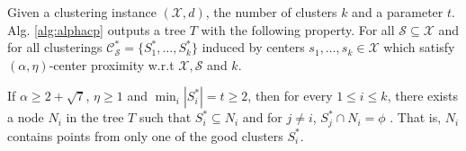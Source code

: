 \documentclass[11pt]{article}
\newcommand{\mc}{\mathcal}
\begin{document}
\begin{theorem}
\label{thm:alphacpnoise}
Given a clustering instance $(\mc X, d)$, the number of clusters $k$ and a parameter $t$. Alg. \ref{alg:alphacp} outputs a tree $T$ with the following property. For all $\mc S \subseteq \mc X$ and for all clusterings $\mc C^*_{\mc S} = \{S_1^*, \ldots, S_k^*\}$ induced by centers $s_1, \ldots, s_k \in \mc X$ which satisfy $(\alpha, \eta)$-center proximity w.r.t $\mc X, \mc S$ and $k$. 

If $\alpha \ge 2 + \sqrt 7$, $\eta \ge 1$ and $ \min_i|S_i^*| = t \ge 2$, then for every $1\le i \le k$, there exists a node $N_i$ in the tree $T$ such that $S_i^* \subseteq N_i$ and for $j \neq i$, $S_j^* \cap N_i = \phi$ . That is, $N_i$ contains points from only one of the good clusters $S_i^*$.
\end{theorem}
\end{document}

